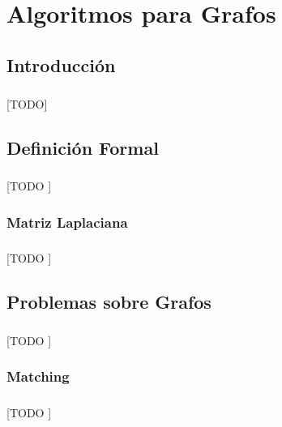\documentclass{subfiles}
\begin{document}
  \chapter{Algoritmos para Grafos}
  \label{chap:graphs}

    \section{Introducción}
    \label{sec:graphs_intro}

      \paragraph{}
      [TODO]

    \section{Definición Formal}
    \label{sec:graph_formalism}

      \paragraph{}
      [TODO ]

      \subsection{Matriz Laplaciana}
      \label{sec:laplacian_matrix}

        \paragraph{}
        [TODO ]

    \section{Problemas sobre Grafos}
    \label{sec:graph_problems}

      \paragraph{}
      [TODO ]

      \subsection{Matching}
      \label{sec:graph_matchings}

        \paragraph{}
        [TODO ]
\end{document}
